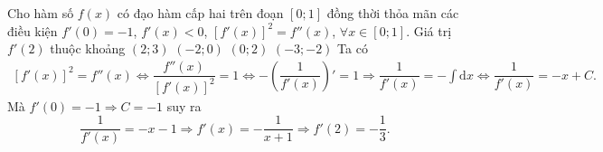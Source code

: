 \begin{ex}%
	Cho hàm số $ f(x)$ có đạo hàm cấp hai trên đoạn $\left[0;1\right]$ đồng thời thỏa mãn các điều kiện $f'(0)=-1$, $f'(x)<0$, $\left[f'(x)\right]^2=f''(x)$, $\forall x\in\left[0;1\right]$. Giá trị $ f'(2)$ thuộc khoảng
	\choice
	{$(2;3)$}
	{\True $(-2;0)$}
	{$(0;2)$}
	{$(-3;-2)$}
	\loigiai
	{
		Ta có
		\begin{align*}
			\left[f'(x)\right]^2=f''(x) \Leftrightarrow\dfrac{f''(x)}{\left[f'(x)\right]^2}=1\Leftrightarrow-\left(\dfrac{1}{f'(x)}\right)'=1\Rightarrow\dfrac{1}{f'(x)}=-\displaystyle\int{\mathrm{d} x} \Leftrightarrow\dfrac{1}{f'(x)}=-x+C.
		\end{align*}
		Mà $f'(0)=-1\Rightarrow C=-1$ suy ra
		$$\dfrac{1}{f'(x)}=-x-1\Rightarrow f'(x)=-\dfrac{1}{x+1} \Rightarrow{f}'(2)=-\dfrac{1}{3}.$$
	}
\end{ex}

